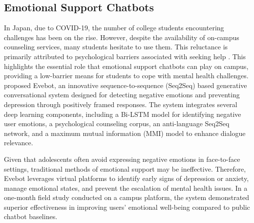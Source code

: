 \documentclass{xum_review}
\begin{document}
\subsection{Emotional Support Chatbots}

In Japan, due to COVID-19, the number of college students encountering
challenges has been on the rise. However, despite the availability of on-campus
counseling services, many students hesitate to use them. This reluctance is
primarily attributed to psychological barriers associated with seeking help
\citep{yasuda2021designing}. This highlights the essential role that emotional support
chatbots can play on campus, providing a low-barrier means for students to cope
with mental health challenges. \citet{yin2019deep} proposed Evebot,
an innovative sequence-to-sequence (Seq2Seq) based generative conversational
system designed for detecting negative emotions and preventing depression
through positively framed responses. The system integrates several deep learning
components, including a Bi-LSTM model for identifying negative user emotions, a
psychological counseling corpus, an anti-language Seq2Seq network, and a maximum
mutual information (MMI) model to enhance dialogue relevance.

Given that adolescents often avoid expressing negative emotions in face-to-face
settings, traditional methods of emotional support may be ineffective.
Therefore, Evebot leverages virtual platforms to identify early signs of
depression or anxiety, manage emotional states, and prevent the escalation of
mental health issues. In a one-month field study conducted on a campus platform,
the system demonstrated superior effectiveness in improving users' emotional
well-being compared to public chatbot baselines.
\end{document}
